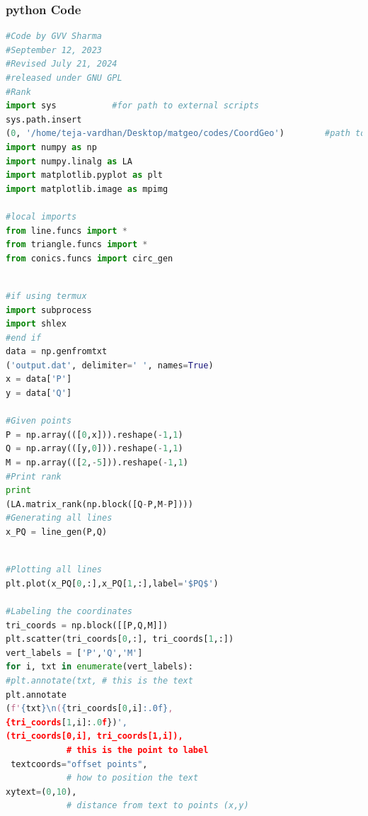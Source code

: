 \documentclass{beamer}
\theoremstyle{remark}
\begin{document}
\begin{frame}[fragile]
\frametitle{python Code}
\begin{lstlisting}[language=python, basicstyle=\ttfamily\small, keywordstyle=\color{blue}]
#Code by GVV Sharma
#September 12, 2023
#Revised July 21, 2024
#released under GNU GPL
#Rank
import sys           #for path to external scripts
sys.path.insert
(0, '/home/teja-vardhan/Desktop/matgeo/codes/CoordGeo')        #path to my scripts
import numpy as np
import numpy.linalg as LA
import matplotlib.pyplot as plt
import matplotlib.image as mpimg

#local imports
from line.funcs import *
from triangle.funcs import *
from conics.funcs import circ_gen


\end{lstlisting}
\end{frame}

\begin{frame}[fragile]

\begin{lstlisting}[language=python, basicstyle=\ttfamily\small, keywordstyle=\color{blue}]

#if using termux
import subprocess
import shlex
#end if
data = np.genfromtxt
('output.dat', delimiter=' ', names=True)
x = data['P']
y = data['Q']

#Given points
P = np.array(([0,x])).reshape(-1,1)  
Q = np.array(([y,0])).reshape(-1,1)  
M = np.array(([2,-5])).reshape(-1,1) 
#Print rank 
print
(LA.matrix_rank(np.block([Q-P,M-P])))
#Generating all lines
x_PQ = line_gen(P,Q)
\end{lstlisting}
\end{frame}

\begin{frame}[fragile]

\begin{lstlisting}[language=python, basicstyle=\ttfamily\small, keywordstyle=\color{blue}]

#Plotting all lines
plt.plot(x_PQ[0,:],x_PQ[1,:],label='$PQ$')

#Labeling the coordinates
tri_coords = np.block([[P,Q,M]])
plt.scatter(tri_coords[0,:], tri_coords[1,:])
vert_labels = ['P','Q','M']
for i, txt in enumerate(vert_labels):
#plt.annotate(txt, # this is the text
plt.annotate
(f'{txt}\n({tri_coords[0,i]:.0f},
{tri_coords[1,i]:.0f})',
(tri_coords[0,i], tri_coords[1,i]),
            # this is the point to label
 textcoords="offset points",
            # how to position the text
xytext=(0,10),
            # distance from text to points (x,y)

\end{lstlisting}
\end{frame}
\end{document}
